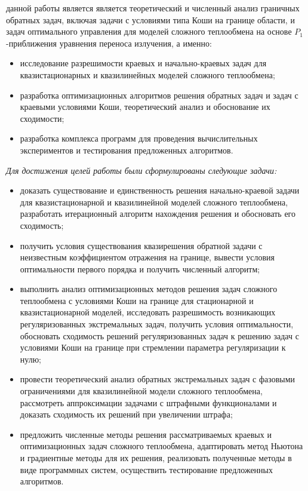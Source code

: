         {\aim} данной работы является является теоретический и численный анализ граничных
    обратных задач, включая задачи с условиями типа Коши на границе области,
    и задач оптимального управления для моделей сложного теплообмена на
    основе $P_1$-приближения уравнения переноса излучения, а именно:
    \begin{itemize}[leftmargin=5.5mm]
        \renewcommand\labelitemi{--}
        \item исследование разрешимости краевых и начально-краевых задач для
        квазистационарных и квазилинейных моделей сложного теплообмена;
        \item разработка оптимизационных алгоритмов решения обратных задач и задач
        с краевыми условиями Коши, теоретический анализ и обоснование их
        сходимости;
        \item разработка комплекса программ для проведения вычислительных
        экспериментов и тестирования предложенных алгоритмов.
    \end{itemize}
    \textit{Для достижения целей работы были сформулированы следующие задачи:}
    \begin{itemize}[leftmargin=5.5mm]
        \renewcommand\labelitemi{--}
        \item доказать существование и единственность решения начально-краевой
        задачи для квазистационарной и квазилинейной моделей сложного теплообмена,
        разработать итерационный алгоритм нахождения решения и обосновать его
        сходимость;
        \item получить условия существования квазирешения обратной задачи с
        неизвестным коэффициентом отражения на границе, вывести условия
        оптимальности первого порядка и получить численный алгоритм;
        \item выполнить анализ оптимизационных методов решения задач сложного
        теплообмена с условиями Коши на границе для стационарной и
        квазистационарной моделей, исследовать разрешимость возникающих
        регуляризованных экстремальных задач, получить условия оптимальности,
        обосновать сходимость решений регуляризованных задач к решению задач с
        условиями Коши на границе при стремлении параметра регуляризации к
        нулю;
        \item провести теоретический анализ обратных экстремальных задач с фазовыми
        ограничениями для квазилинейной модели сложного теплообмена,
        рассмотреть аппроксимации задачами с штрафными функционалами и
        доказать сходимость их решений при увеличении штрафа;
        \item предложить численные методы решения рассматриваемых краевых и
        оптимизационных задач сложного теплообмена, адаптировать метод
        Ньютона и градиентные методы для их решения, реализовать полученные
        методы в виде программных систем, осуществить тестирование
        предложенных алгоритмов.
    \end{itemize}


